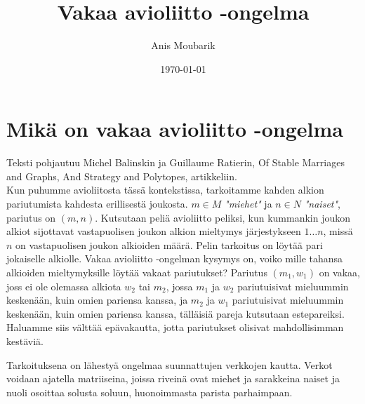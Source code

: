 \documentclass[finnish]{tktltiki2}
\title{Vakaa avioliitto -ongelma}
\author{Anis Moubarik}
\date{\today}
\theoremstyle{definition}
\theoremstyle{remark}
\begin{document}

\maketitle        %
\makeabstract     %

\newpage          %



\section{Mikä on vakaa avioliitto -ongelma}

Teksti pohjautuu Michel Balinskin ja Guillaume Ratierin, Of Stable Marriages and Graphs, And Strategy and Polytopes, artikkeliin.\\
Kun puhumme avioliitosta tässä kontekstissa, tarkoitamme kahden alkion pariutumista kahdesta erillisestä joukosta. $m \in M$ \emph{"miehet"} ja $n \in N$ \emph{"naiset"}, pariutus on $(m, n)$.
Kutsutaan peliä avioliitto peliksi, kun kummankin joukon alkiot sijottavat vastapuolisen joukon alkion mieltymys järjestykseen $1 \ldots n$, missä $n$ on vastapuolisen joukon alkioiden määrä. Pelin tarkoitus on löytää pari jokaiselle alkiolle. Vakaa avioliitto -ongelman kysymys on, voiko mille tahansa alkioiden mieltymyksille löytää vakaat pariutukset? Pariutus $(m_{1}, w_{1})$ on vakaa, joss ei ole olemassa alkiota $w_{2}$ tai $m_{2}$, jossa $m_{1}$ ja $w_{2}$ pariutuisivat mieluummin keskenään, kuin omien pariensa kanssa, ja $m_{2}$ ja $w_{1}$ pariutuisivat mieluummin keskenään, kuin omien pariensa kanssa, tälläisiä pareja kutsutaan estepareiksi. Haluamme siis välttää epävakautta, jotta pariutukset olisivat mahdollisimman kestäviä.

Tarkoituksena on lähestyä ongelmaa suunnattujen verkkojen kautta. Verkot voidaan ajatella matriiseina, joissa riveinä ovat miehet ja sarakkeina naiset ja nuoli osoittaa solusta soluun, huonoimmasta parista parhaimpaan.
\end{document}
